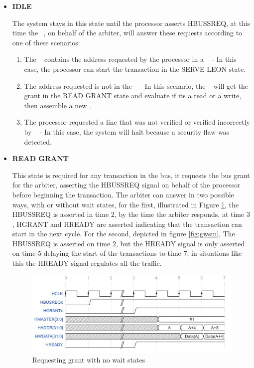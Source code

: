 \begin{itemize}
 \item{\textbf{IDLE}}
 
The system stays in this state until the processor asserts HBUSSREQ, at this time the \handler~, on behalf of the arbiter, will answer these requests according to one of these scenarios:
 \begin{enumerate}
     \item The \sbuf~ contains the address requested by the processor in a \sline~ - In this case, the processor can start the transaction in the SERVE LEON state.
     \item The address requested is not in the \sbuf~ - In this scenario, the \handler~ will get the grant in the READ GRANT state and evaluate if its a read or a write, then assemble a new \sline.
     \item The processor requested a line that was not verified or verified incorrectly by \seceng~ -  In this case, the system will halt because a security flaw was detected.
 \end{enumerate}

 
  \item{\textbf{READ GRANT}}

  This state is required for any transaction in the bus, it requests the bus grant for the arbiter, asserting the HBUSSREQ signal on behalf of the processor before beginning the transaction. The arbiter can answer in two possible ways, with or without wait states, for the first, illustrated in Figure \ref{fig:gnwsm},  the HBUSSREQ is asserted in time $2$, by the time the arbiter responds, at time $3$, HGRANT and HREADY are asserted  indicating that the transaction can start in the next cycle. For the second, depicted in figure \ref{fig:gwsm}, The  HBUSSREQ is asserted on time $2$, but the HREADY signal is only asserted on time $5$ delaying the start of the transactions to time $7$, in situations like this the HREADY signal regulates all the traffic. 
  
  
\begin{figure}[!ht]
    \centering
    \includegraphics[width=\textwidth]{figures/others/read_grant_no_wait_new.JPG}
    \caption{Requesting grant with no wait states  }
    \label{fig:gnwsm}
\end{figure}



\end{itemize}
